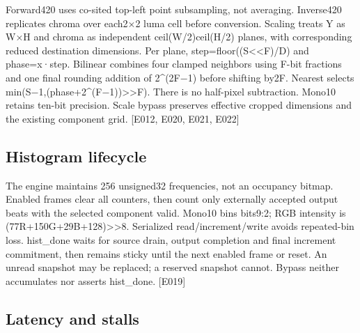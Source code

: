 \documentclass[11pt,a4paper]{article}
\begin{document}
Forward420 uses co-sited top-left point subsampling,\allowbreak{} not averaging. Inverse420 replicates chroma over each2{\vulcanmathsymbols ×}2 luma cell before conversion. Scaling treats Y as W{\vulcanmathsymbols ×}H and chroma as independent ceil(\allowbreak{}W/\allowbreak{}2)ceil(\allowbreak{}H/\allowbreak{}2)\allowbreak{} planes,\allowbreak{} with corresponding reduced destination dimensions. Per plane,\allowbreak{} step=\allowbreak{}floor(\allowbreak{}(\allowbreak{}S<<F)\allowbreak{}/\allowbreak{}D)\allowbreak{} and phase=\allowbreak{}x·step. Bilinear combines four clamped neighbors using F-bit fractions and one final rounding addition of 2\textasciicircum{}(\allowbreak{}2F{\vulcanmathsymbols −}1)\allowbreak{} before shifting by2F. Nearest selects min(\allowbreak{}S{\vulcanmathsymbols −}1,\allowbreak{}(\allowbreak{}phase+\allowbreak{}2\textasciicircum{}(\allowbreak{}F{\vulcanmathsymbols −}1)\allowbreak{})\allowbreak{}>>F)\allowbreak{}. There is no half-pixel subtraction. Mono10 retains ten-bit precision. Scale bypass preserves effective cropped dimensions and the existing component grid. [\allowbreak{}E012,\allowbreak{} E020,\allowbreak{} E021,\allowbreak{} E022]\allowbreak{}

\subsection{Histogram lifecycle}

The engine maintains 256 unsigned32 frequencies,\allowbreak{} not an occupancy bitmap. Enabled frames clear all counters,\allowbreak{} then count only externally accepted output beats with the selected component valid. Mono10 bins bits9:2; RGB intensity is (\allowbreak{}77R+\allowbreak{}150G+\allowbreak{}29B+\allowbreak{}128)\allowbreak{}>>8. Serialized read/\allowbreak{}increment/\allowbreak{}write avoids repeated-bin loss. hist\_\allowbreak{}done waits for source drain,\allowbreak{} output completion and final increment commitment,\allowbreak{} then remains sticky until the next enabled frame or reset. An unread snapshot may be replaced; a reserved snapshot cannot. Bypass neither accumulates nor asserts hist\_\allowbreak{}done. [\allowbreak{}E019]\allowbreak{}

\subsection{Latency and stalls}
\end{document}
